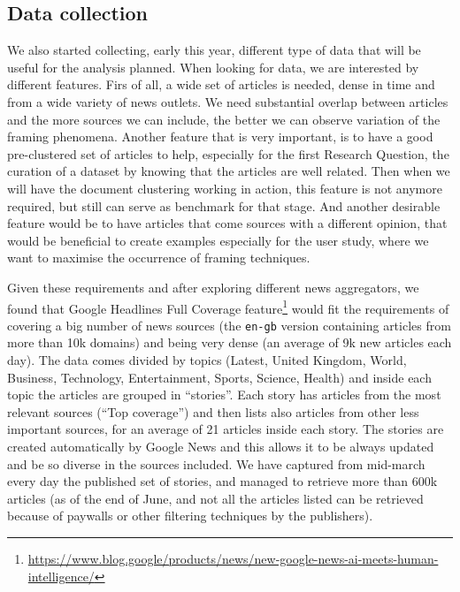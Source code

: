 \subsection{Data collection}
We also started collecting, early this year, different type of data that will be useful for the analysis planned.
When looking for data, we are interested by different features.
Firs of all, a wide set of articles is needed, dense in time and from a wide variety of news outlets. We need substantial overlap between articles and the more sources we can include, the better we can observe variation of the framing phenomena.
Another feature that is very important, is to have a good pre-clustered set of articles to help, especially for the first Research Question, the curation of a dataset by knowing that the articles are well related. Then when we will have the document clustering working in action, this feature is not anymore required, but still can serve as benchmark for that stage.
And another desirable feature would be to have articles that come sources with a different opinion, that would be beneficial to create examples especially for the user study, where we want to maximise the occurrence of framing techniques. 

Given these requirements and after exploring different news aggregators, we found that Google Headlines Full Coverage feature\footnote{\url{https://www.blog.google/products/news/new-google-news-ai-meets-human-intelligence/}} would fit the requirements of covering a big number of news sources (the \texttt{en-gb} version containing articles from more than 10k domains) and being very dense (an average of 9k new articles each day).
The data comes divided by topics (Latest, United Kingdom, World, Business, Technology, Entertainment, Sports, Science, Health) and inside each topic the articles are grouped in ``stories''. Each story has articles from the most relevant sources (``Top coverage'') and then lists also articles from other less important sources, for an average of 21 articles inside each story.
The stories are created automatically by Google News and this allows it to be always updated and be so diverse in the sources included.
We have captured from mid-march every day the published set of stories, and managed to retrieve more than 600k articles (as of the end of June, and not all the articles listed can be retrieved because of paywalls or other filtering techniques by the publishers).

